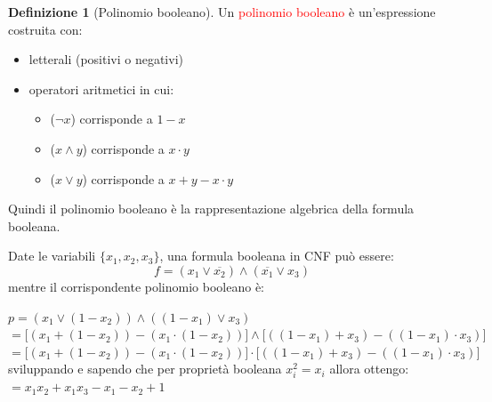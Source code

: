 \documentclass{article}  %
\theoremstyle{definition}
\newtheorem{definition}{Definizione}[section]
\begin{document}
\begin{definition}[Polinomio booleano]
	Un \textcolor{red}{polinomio booleano} è un'espressione costruita con:
	\begin{itemize}
		\item letterali (positivi o negativi)
		\item operatori aritmetici in cui:
		      \begin{itemize}
			      \item ($\lnot x$) corrisponde a $1-x$
			      \item ($x \land y$) corrisponde a $x \cdot y$
			      \item ($x \lor y$) corrisponde a $x + y - x \cdot y$
		      \end{itemize}
	\end{itemize}
	Quindi il polinomio booleano è la rappresentazione algebrica della formula booleana.
\end{definition}
\begin{esercizio}[Esempio]
	\footnotesize
	Date le variabili $\{x_1,x_2,x_3\}$, una formula booleana in CNF può essere:
	\[
		f = (x_1 \lor \overline{x_2}) \land (\overline{x_1} \lor x_3)
	\]
	mentre il corrispondente polinomio booleano è:
	\begin{center}
		$p = (x_1 \lor (1-x_2)) \land ((1-x_1) \lor x_3)$ \\
		$= \big[(x_1+(1-x_2))-(x_1 \cdot (1-x_2))\big] \land \big[((1-x_1)+x_3) - ((1-x_1)\cdot x_3)\big]$ \\
		$= \big[(x_1+(1-x_2))-(x_1 \cdot (1-x_2))\big] \cdot \big[((1-x_1)+x_3) - ((1-x_1)\cdot x_3)\big]$ \\
		sviluppando e sapendo che per proprietà booleana $x_i^2=x_i$ allora ottengo: \\
		$= x_1x_2+x_1x_3-x_1-x_2+1$
	\end{center}

\end{esercizio}
\end{document}
